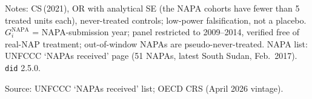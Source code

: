 \begin{table}[H]
\centering
\caption{NAPA submission as a low-power falsification check}
\label{tab:napa_falsification}
\par\vspace{4pt}
\begin{minipage}{\linewidth}\footnotesize
Notes: CS\,(2021), OR with analytical SE (the NAPA cohorts have fewer than 5 treated units each), never-treated controls; low-power falsification, not a placebo. $G_i^{\mathrm{NAPA}}$ = NAPA-submission year; panel restricted to 2009--2014, verified free of real-NAP treatment; out-of-window NAPAs are pseudo-never-treated. NAPA list: UNFCCC `NAPAs received' page (51 NAPAs, latest South Sudan, Feb.\ 2017). \texttt{did} 2.5.0.\par
Source: UNFCCC `NAPAs received' list; OECD CRS (April 2026 vintage).
\end{minipage}
\end{table}
